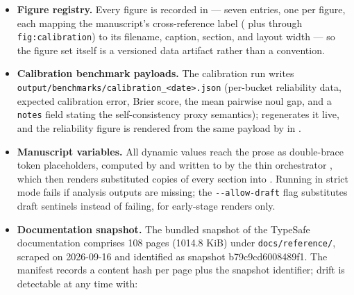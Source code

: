 \documentclass[
  english,
]{article}
\begin{document}
\begin{itemize}
  The data-driven figures read
  ,
  , and
  , resolving ``latest''
  by filename date; a missing benchmark file is reported as a clear
  error naming the missing file rather than silently producing an empty
  chart. The same rule applies to the graphical abstract of
  sec.~\ref{sec:abstract}, which composes the latest batching, latency,
  and calibration payloads into its live-outputs panel. The two
  schematic figures and the parametric confidence-band illustration
  require no data and no network.
\item
  \textbf{Figure registry.} Every figure is recorded in
   --- seven entries, one per
  figure, each mapping the manuscript's cross-reference label
  ( plus 
  through \texttt{fig:calibration}) to its filename, caption, section,
  and layout width --- so the figure set itself is a versioned data
  artifact rather than a convention.
\item
  \textbf{Calibration benchmark payloads.} The calibration run writes
  \texttt{output/benchmarks/calibration\_\textless{}date\textgreater{}.json}
  (per-bucket reliability data, expected calibration error, Brier score,
  the mean pairwise noul gap, and a \texttt{notes} field stating the
  self-consistency proxy semantics);
   regenerates it live, and the
  reliability figure  is
  rendered from the same payload by  in
  .
\item
  \textbf{Manuscript variables.} All dynamic values reach the prose as
  double-brace token placeholders, computed by
  and written to  by the
  thin orchestrator
  , which then
  renders substituted copies of every section into
  . Running in strict mode fails if analysis
  outputs are missing; the \texttt{-\/-allow-draft} flag substitutes
  draft sentinels instead of failing, for early-stage renders only.
\item
  \textbf{Documentation snapshot.} The bundled snapshot of the TypeSafe
  documentation comprises 108 pages (1014.8 KiB) under
  \texttt{docs/reference/}, scraped on 2026-09-16 and identified as
  snapshot b79c9cd6008489f1. The manifest records a content hash per
  page plus the snapshot identifier; drift is detectable at any time
  with:


\end{itemize}
\end{document}

